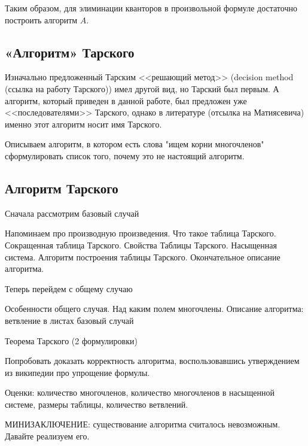 Таким образом, для элиминации кванторов в произвольной формуле достаточно построить алгоритм $A$.

\subsection{«Алгоритм» Тарского}

Изначально предложенный Тарским <<решающий метод>> (decision method (ссылка на работу Тарского)) имел другой вид, но Тарский был первым. А алгоритм, который приведен в данной работе, был предложен уже <<последователями>> Тарского, однако в литературе (отсылка на Матиясевича) именно этот алгоритм носит имя Тарского.

Описываем алгоритм, в котором есть слова "ищем корни многочленов"
сформулировать список того, почему это не настоящий алгоритм.

\subsection{Алгоритм Тарского}

Сначала рассмотрим базовый случай

Напоминаем про производную произведения. Что такое таблица Тарского. Сокращенная таблица Тарского. Свойства Таблицы Тарского. Насыщенная система. Алгоритм построения таблицы Тарского. Окончательное описание алгоритма.

Теперь перейдем с общему случаю

Особенности общего случая. Над каким полем многочлены. Описание алгоритма: ветвление в листах базовый случай

Теорема Тарского (2 формулировки)

Попробовать доказать корректность алгоритма, воспользовавшись утверждением из википедии про упрощение формулы.

Оценки: количество многочленов, количество многочленов в насыщенной системе, размеры таблицы, количество ветвлений.

МИНИЗАКЛЮЧЕНИЕ: существование алгоритма считалось невозможным. Давайте реализуем его.




